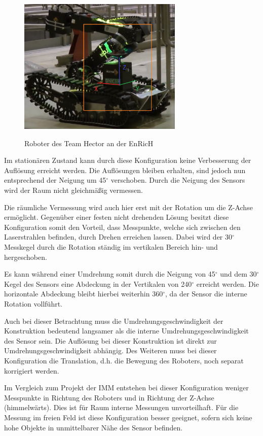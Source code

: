 \begin{figure}[H]
	\centering
	\includegraphics[width=0.7\textwidth]
	{resources/hector.PNG}
	\caption[Roboter des Team Hector EnRicH]{Roboter des Team Hector an der EnRicH} \protect\cite{hector}
	\label{fig:hector}
\end{figure}

Im stationären Zustand kann durch diese Konfiguration keine Verbesserung der Auflösung erreicht werden. Die Auflösungen bleiben erhalten, sind jedoch nun entsprechend der Neigung um 45$^\circ$ verschoben. Durch die Neigung des Sensors wird der Raum nicht gleichmäßig vermessen. 

Die räumliche Vermessung wird auch hier erst mit der Rotation um die Z-Achse ermöglicht. Gegenüber einer festen nicht drehenden Lösung besitzt diese Konfiguration somit den Vorteil, dass Messpunkte, welche sich zwischen den Laserstrahlen befinden, durch Drehen erreichen lassen. Dabei wird der 30$^\circ$ Messkegel durch die Rotation ständig im vertikalen Bereich hin- und hergeschoben.

Es kann während einer Umdrehung somit durch die Neigung von 45$^\circ$ und dem 30$^\circ$ Kegel des Sensors eine Abdeckung in der Vertikalen von 240$^\circ$ erreicht werden. Die horizontale Abdeckung bleibt hierbei weiterhin 360$^\circ$, da der Sensor die interne Rotation vollführt.

Auch bei dieser Betrachtung  muss die Umdrehungsgeschwindigkeit der Konstruktion bedeutend langsamer als die interne Umdrehungsgeschwindigkeit des Sensor sein. Die Auflösung bei dieser Konstruktion ist direkt zur Umdrehungsgeschwindigkeit abhängig. Des Weiteren muss bei dieser Konfiguration die Translation, d.h. die Bewegung des Roboters, noch separat korrigiert werden.  

Im Vergleich zum Projekt der IMM entstehen bei dieser Konfiguration weniger Messpunkte in Richtung des Roboters und in Richtung der Z-Achse (himmelwärts). Dies ist für Raum interne Messungen unvorteilhaft. Für die Messung im freien Feld ist diese Konfiguration besser geeignet, sofern sich keine hohe Objekte in unmittelbarer Nähe des Sensor befinden. 
 	

